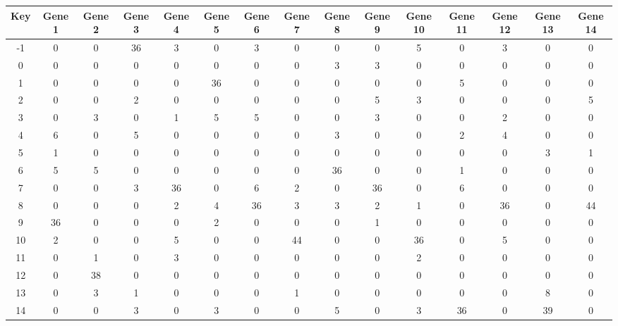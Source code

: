 \begin{tabular}{|c|c|c|c|c|c|c|c|c|c|c|c|c|c|c|}
\hline
Key & Gene 1 & Gene 2 & Gene 3 & Gene 4 & Gene 5 & Gene 6 & Gene 7 & Gene 8 & Gene 9 & Gene 10 & Gene 11 & Gene 12 & Gene 13 & Gene 14 \\
\hline
-1 & 0 & 0 & 36 & 3 & 0 & 3 & 0 & 0 & 0 & 5 & 0 & 3 & 0 & 0 \\
0 & 0 & 0 & 0 & 0 & 0 & 0 & 0 & 3 & 3 & 0 & 0 & 0 & 0 & 0 \\
1 & 0 & 0 & 0 & 0 & 36 & 0 & 0 & 0 & 0 & 0 & 5 & 0 & 0 & 0 \\
2 & 0 & 0 & 2 & 0 & 0 & 0 & 0 & 0 & 5 & 3 & 0 & 0 & 0 & 5 \\
3 & 0 & 3 & 0 & 1 & 5 & 5 & 0 & 0 & 3 & 0 & 0 & 2 & 0 & 0 \\
4 & 6 & 0 & 5 & 0 & 0 & 0 & 0 & 3 & 0 & 0 & 2 & 4 & 0 & 0 \\
5 & 1 & 0 & 0 & 0 & 0 & 0 & 0 & 0 & 0 & 0 & 0 & 0 & 3 & 1 \\
6 & 5 & 5 & 0 & 0 & 0 & 0 & 0 & 36 & 0 & 0 & 1 & 0 & 0 & 0 \\
7 & 0 & 0 & 3 & 36 & 0 & 6 & 2 & 0 & 36 & 0 & 6 & 0 & 0 & 0 \\
8 & 0 & 0 & 0 & 2 & 4 & 36 & 3 & 3 & 2 & 1 & 0 & 36 & 0 & 44 \\
9 & 36 & 0 & 0 & 0 & 2 & 0 & 0 & 0 & 1 & 0 & 0 & 0 & 0 & 0 \\
10 & 2 & 0 & 0 & 5 & 0 & 0 & 44 & 0 & 0 & 36 & 0 & 5 & 0 & 0 \\
11 & 0 & 1 & 0 & 3 & 0 & 0 & 0 & 0 & 0 & 2 & 0 & 0 & 0 & 0 \\
12 & 0 & 38 & 0 & 0 & 0 & 0 & 0 & 0 & 0 & 0 & 0 & 0 & 0 & 0 \\
13 & 0 & 3 & 1 & 0 & 0 & 0 & 1 & 0 & 0 & 0 & 0 & 0 & 8 & 0 \\
14 & 0 & 0 & 3 & 0 & 3 & 0 & 0 & 5 & 0 & 3 & 36 & 0 & 39 & 0 \\
\hline
\end{tabular}